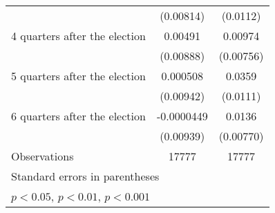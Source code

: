 \begin{table}[htbp]
\begin{tabular}{l*{2}{c}}
                    &   (0.00814)         &    (0.0112)         \\
[1em]
 4 quarters after the election&     0.00491         &     0.00974         \\
                    &   (0.00888)         &   (0.00756)         \\
[1em]
 5 quarters after the election&    0.000508         &      0.0359\sym{**} \\
                    &   (0.00942)         &    (0.0111)         \\
[1em]
 6 quarters after the election&  -0.0000449         &      0.0136         \\
                    &   (0.00939)         &   (0.00770)         \\
\hline
Observations        &       17777         &       17777         \\
\hline\hline
\multicolumn{3}{l}{\footnotesize Standard errors in parentheses}\\
\multicolumn{3}{l}{\footnotesize \sym{*} \(p<0.05\), \sym{**} \(p<0.01\), \sym{***} \(p<0.001\)}\\
\end{tabular}
\end{table}
